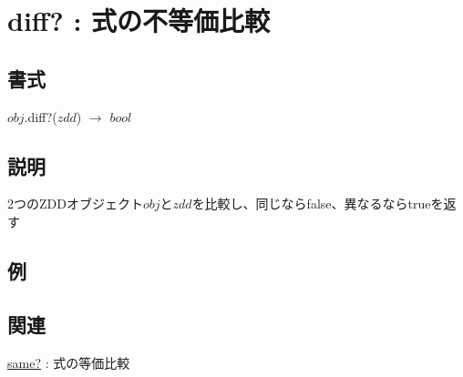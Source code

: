 
\section{diff? : 式の不等価比較\label{sect:diff?}}
\subsection*{書式}
$obj$.diff?($zdd$) $\rightarrow$ $bool$

\subsection*{説明}
2つのZDDオブジェクト$obj$と$zdd$を比較し、同じならfalse、異なるならtrueを返す

\subsection*{例}


\subsection*{関連}
\hyperref[sect:same?]{same?} : 式の等価比較

